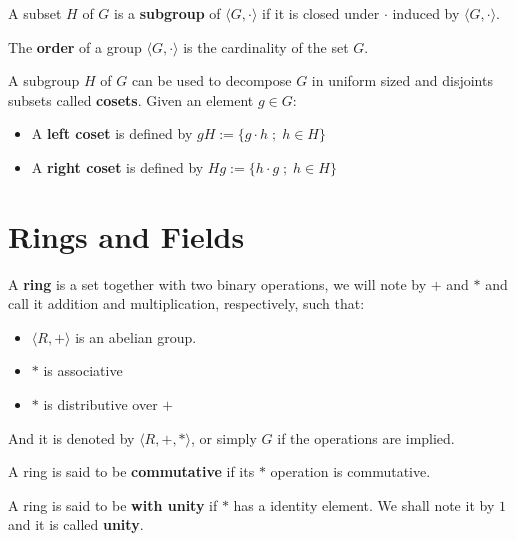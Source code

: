 \documentclass[Ingles]{ic-tese-v3}
\begin{document}
\begin{definition}
  A subset $H$ of $G$ is a \textbf{subgroup} of $\langle G,\cdot \rangle$ if it is
  closed under $\cdot$ induced by $\langle G,\cdot \rangle$.
\end{definition}

\begin{definition}
  The \textbf{order} of a group $\langle G,\cdot\rangle$ is the cardinality of the set $G$.
\end{definition}

\begin{definition}
  A subgroup $H$ of $G$ can be used to decompose $G$ in uniform sized and
  disjoints subsets called \textbf{cosets}. Given an element $g \in G$:
  \begin{itemize}
  \item A \textbf{left coset} is defined by $gH := \{g\cdot h \; ; \; h \in H\}$
  \item A \textbf{right coset} is defined by $Hg := \{h\cdot g \; ; \; h \in H\}$
  \end{itemize}
\end{definition}

\section{Rings and Fields}
\label{sec:org5ff335c}

   \begin{definition}
  A \textbf{ring} is a set together with two binary operations, we will note by
  $+$ and $*$ and call it addition and multiplication, respectively, such that:
  \begin{itemize}
  \item $\langle R,+\rangle$ is an abelian group.
  \item $*$ is associative
  \item $*$ is distributive over $+$
  \end{itemize}

  And it is denoted by $\langle R,+,*\rangle$, or simply $G$ if the operations are implied.
\end{definition}

\begin{definition}
  A ring is said to be \textbf{commutative} if its $*$ operation is commutative.
\end{definition}

\begin{definition}
  A ring is said to be \textbf{with unity} if $*$ has a identity element. We
  shall note it by $1$ and it is called \textbf{unity}.

\end{definition}
\end{document}
